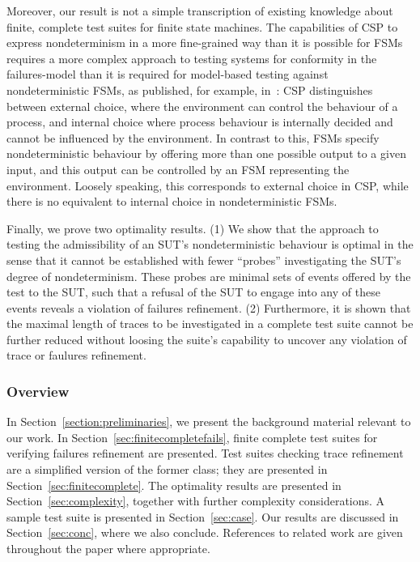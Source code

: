 Moreover, our result is not a simple transcription of existing knowledge
about finite, complete test suites for finite state machines. The
capabilities of CSP to express nondeterminism in a more fine-grained way than
it is possible for FSMs requires a more complex approach to testing systems
for conformity in the failures-model than it is required for model-based
testing against nondeterministic FSMs, as published, for example,
in~\cite{hierons_testing_2004,DBLP:conf/hase/PetrenkoY14}: CSP distinguishes between 
external choice, where the environment can control the behaviour of a process, and
internal choice where process behaviour is internally decided and cannot be influenced
by the environment. In contrast to this, FSMs specify nondeterministic behaviour
by offering more than one possible output to a given input, and this output can be 
controlled by an FSM representing the environment. Loosely speaking, this corresponds to external choice in CSP, while there is no equivalent to internal choice in nondeterministic FSMs.

Finally, we prove two optimality results.
(1) We show that the
approach to testing the admissibility of an SUT's nondeterministic behaviour
is optimal in the sense that it cannot be established with fewer ``probes'' investigating
the SUT's degree of nondeterminism. These probes are minimal sets of events offered
by the test to the SUT, such that a refusal of the SUT to engage into any of these events
reveals a violation of failures refinement.
(2) Furthermore, it is shown that the maximal length of traces to be investigated in 
a complete test suite cannot be further reduced without loosing the suite's capability to
uncover any violation of trace or faulures  refinement. 


 

\subsubsection*{Overview}
In Section~\ref{section:preliminaries}, we present the background material
relevant to our work. In Section~\ref{sec:finitecompletefails}, finite
complete test suites for verifying failures refinement are presented. Test
suites checking trace refinement are a simplified version of the former
class; they are presented in Section~\ref{sec:finitecomplete}. 
The optimality results are presented in Section~\ref{sec:complexity}, together with further
complexity considerations.
A sample test
suite is presented in Section~\ref{sec:case}. Our results are discussed in
Section~\ref{sec:conc}, where we also conclude. References to related work
are given throughout the paper where appropriate.


